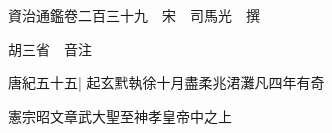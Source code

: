 






























































資治通鑑卷二百三十九　宋　司馬光　撰

胡三省　音注

唐紀五十五|{
	起玄黓執徐十月盡柔兆涒灘凡四年有奇}


憲宗昭文章武大聖至神孝皇帝中之上

